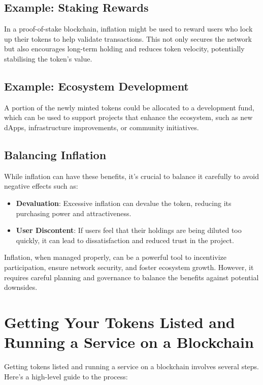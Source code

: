 \documentclass{tufte-handout}
\begin{document}
\subsection*{Example: Staking Rewards}

In a proof-of-stake blockchain, inflation might be used to reward users who lock up their tokens to help validate transactions.
This not only secures the network but also encourages long-term holding and reduces token velocity, potentially stabilising the token's value.

\subsection*{Example: Ecosystem Development}

A portion of the newly minted tokens could be allocated to a development fund, which can be used to support projects that enhance the ecosystem, such as new dApps,
infrastructure improvements, or community initiatives.

\subsection*{Balancing Inflation}

While inflation can have these benefits, it's crucial to balance it carefully to avoid negative effects such as:
\begin{itemize}
    \item \textbf{Devaluation}: Excessive inflation can devalue the token, reducing its purchasing power and attractiveness.
    \item \textbf{User Discontent}: If users feel that their holdings are being diluted too quickly, it can lead to dissatisfaction and reduced trust in the project.
\end{itemize}

Inflation, when managed properly, can be a powerful tool to incentivize participation, ensure network security, and foster ecosystem growth.
However, it requires careful planning and governance to balance the benefits against potential downsides.

\section*{Getting Your Tokens Listed and Running a Service on a Blockchain}

Getting tokens listed and running a service on a blockchain involves several steps. Here's a high-level guide to the process:
\end{document}
